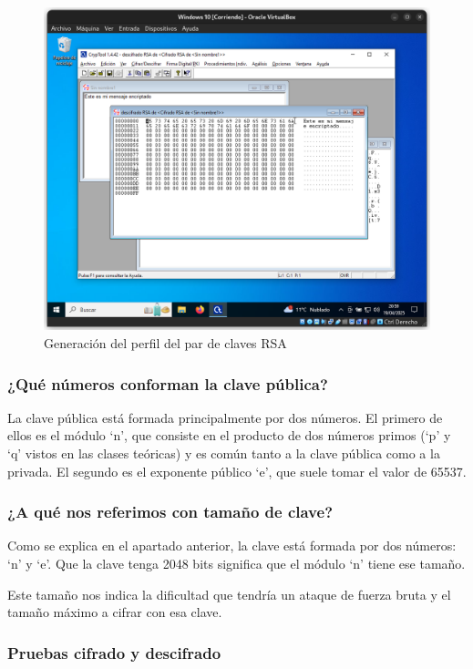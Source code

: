 \begin{figure}[H]
    \includegraphics[width=15cm]{ClavesRSA-07.png}
    \caption{Generación del perfil del par de claves RSA}
\end{figure}


\subsubsection{¿Qué números conforman la clave pública?}

La clave pública está formada principalmente por dos números. El primero de ellos es el módulo ‘n’, que consiste en el producto de dos números primos (‘p’ y ‘q’ vistos en las clases teóricas) y es común tanto a la clave pública como a la privada. El segundo es el exponente público ‘e’, que suele tomar el valor de 65537. 

\subsubsection{¿A qué nos referimos con tamaño de clave?}

Como se explica en el apartado anterior, la clave está formada por dos números: ‘n’ y ‘e’. Que la clave tenga 2048 bits significa que el módulo ‘n’ tiene ese tamaño.  

Este tamaño nos indica la dificultad que tendría un ataque de fuerza bruta y el tamaño máximo a cifrar con esa clave. 


\subsubsection{Pruebas cifrado y descifrado}

